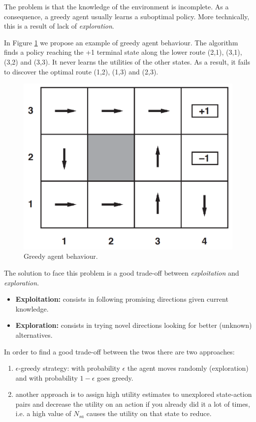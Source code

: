 The problem is that the knowledge of the environment is incomplete. As a consequence, a greedy agent usually learns a suboptimal policy. More technically, this is a result of lack of \textit{exploration}. \newline

In Figure \ref{fig:greedyAgent} we propose an example of greedy agent behaviour. The algorithm finds a policy reaching the +1 terminal state along the lower route (2,1), (3,1), (3,2) and (3,3). It never learns the utilities of the other states. As a result, it fails to discover the optimal route (1,2), (1,3) and (2,3).

\begin{figure}
    \centering
    \includegraphics[width=\textwidth]{images/greedyAgent.png}
    \caption{Greedy agent behaviour.}
    \label{fig:greedyAgent}
\end{figure}

The solution to face this problem is a good trade-off between \textit{exploitation} and \textit{exploration}.
\begin{itemize}
    \item \textbf{Exploitation:} consists in following promising directions given current knowledge.
    
    \item \textbf{Exploration:} consists in trying novel directions looking for better (unknown) alternatives.
\end{itemize}

In order to find a good trade-off between the twos there are two approaches:
\begin{enumerate}
    \item $\epsilon$-greedy strategy: with probability $\epsilon$ the agent moves randomly (exploration) and with probability $1 - \epsilon$ goes greedy.
    
    \item another approach is to assign high utility estimates to unexplored state-action pairs and decrease the utility on an action if you already did it a lot of times, i.e. a high value of $N_{sa}$ causes the utility on that state to reduce.
\end{enumerate}

